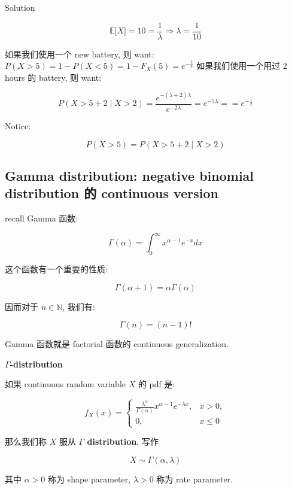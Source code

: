 \documentclass{qlnotes-export}
\begin{document}
\begin{qlsolution}{Solution}

\[{\mathbb{E}}\lbrack X\rbrack = 10 = \frac{1}{\lambda}\Longrightarrow\lambda = \frac{1}{10}\]

如果我们使用一个 new battery, 则 want: \(P(X > 5) = 1 - P(X < 5) = 1 - F_{X}(5) = e^{- \frac{1}{2}}\) 如果我们使用一个用过 2 hours 的 battery, 则 want:

\[P(X > 5 + 2 \mid X > 2) = \frac{e^{- (5 + 2)\lambda}}{e^{- 2\lambda}} = e^{- 5\lambda} = = e^{- \frac{1}{2}}\]

Notice:

\[P(X > 5) = P(X > 5 + 2 \mid X > 2)\]

\end{qlsolution}

\subsection{Gamma distribution: negative binomial distribution 的 continuous version}\label{gamma-distribution-negative-binomial-distribution-ux7684-continuous-version}

recall Gamma 函数:

\[\Gamma(\alpha) = \int_{0}^{\infty}x^{\alpha - 1}e^{- x} dx\]

这个函数有一个重要的性质:

\[\Gamma(\alpha + 1) = \alpha\Gamma(\alpha)\]

因而对于 \(n \in {\mathbb{N}}\), 我们有:

\[\Gamma(n) = (n - 1)!\]

Gamma 函数就是 factorial 函数的 continuous generalization.

\begin{definition}{\protect{}\label{kn-gamma-distribution}{\textbf{\(\Gamma\)-distribution}}}

如果 continuous random variable \(X\) 的 pdf 是:

\[f_{X}(x) = \left\{ \begin{matrix}
{\frac{\lambda^{\alpha}}{\Gamma(\alpha)}x^{\alpha - 1}e^{- \lambda x},} & {x > 0,} \\
{0,} & {x \leq 0}
\end{matrix} \right.\]

那么我们称 \(X\) 服从 \textbf{\(\Gamma\) distribution}, 写作

\[X \sim \Gamma(\alpha,\lambda)\]

其中 \(\alpha > 0\) 称为 shape parameter, \(\lambda > 0\) 称为 rate parameter.

\end{definition}
\end{document}
